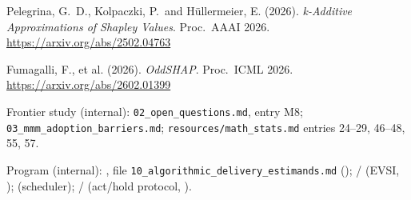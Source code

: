 \begin{enumerate}[label={[\arabic*]},leftmargin=2.5em]
\item Pelegrina, G.\ D., Kolpaczki, P.\ and H\"ullermeier, E. (2026). \emph{k-Additive Approximations of Shapley Values}. Proc.\ AAAI 2026. \url{https://arxiv.org/abs/2502.04763}
\item Fumagalli, F., et al. (2026). \emph{OddSHAP}. Proc.\ ICML 2026. \url{https://arxiv.org/abs/2602.01399}
\item Frontier study (internal): \texttt{02\_open\_questions.md}, entry M8; \texttt{03\_mmm\_adoption\_barriers.md}; \texttt{resources/math\_stats.md} entries 24--29, 46--48, 55, 57.
\item Program (internal): , file \texttt{10\_algorithmic\_delivery\_estimands.md} (); / (EVSI, );  (scheduler); / (act/hold protocol, ).
\end{enumerate}
\endgroup
